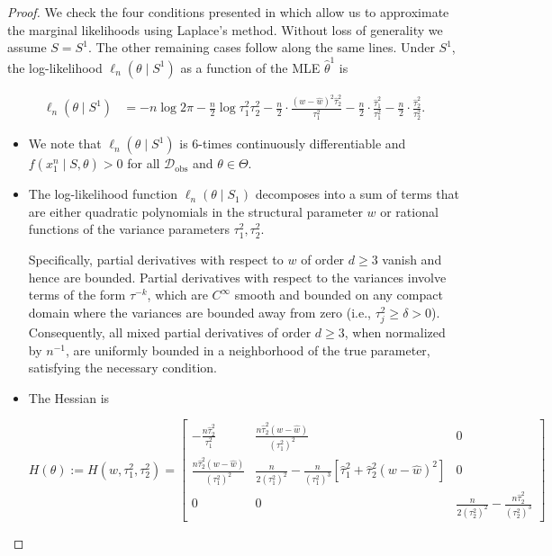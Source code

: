 \documentclass[accepted]{uai2026} %
\newcommand{\train}{\mathcal{D}}
\newcommand{\obsdata}{\train_{\text{obs}}}
\theoremstyle{boldremark}
\begin{document}
\begin{proof}
    We check the four conditions presented in \citet{Kass1990TheVO} which allow us to approximate the marginal likelihoods using Laplace's method. Without loss of generality we assume $S = S^1$. The other  remaining cases follow along the same lines. Under $S^1$, the log-likelihood $\ell_n(\theta \mid  S^1)$ as a function of the MLE $\hat{\theta}^1$ is

    \begin{align}
    \label{eq:MLE_expansion_S1}
    \ell_n(\theta \mid  S^1) &= -n \log 2\pi -\frac{n}{2}\log \tau_1^2\tau_2^2 - \frac{n}{2}\cdot\frac{(w-\hat{w})^2\hat{\tau}^2_2}{\tau_1^2} - \frac{n}{2}\cdot \frac{\hat{\tau}_1^2}{\tau_1^2}- \frac{n}{2}\cdot \frac{\hat{\tau}_2^2}{\tau_2^2}.
    \end{align}

    \begin{itemize}
        \item[(i)] We note that $\ell_n( \theta \mid S^1)$ is 6-times continuously differentiable and $f(x_1^n \mid S, \theta) >0$ for all $\obsdata$ and $\theta \in \Theta$. 

        \item[(ii)] The log-likelihood function $\ell_n(\theta\mid S_1)$ decomposes into a sum of terms that are either quadratic polynomials in the structural parameter $w$ or rational functions of the variance parameters $\tau_1^2, \tau_2^2$.

        Specifically, partial derivatives with respect to $w$ of order $d \ge 3$ vanish and hence are bounded. Partial derivatives with respect to the variances involve terms of the form $\tau^{-k}$, which are $C^\infty$ smooth and bounded on any compact domain where the variances are bounded away from zero (i.e., $\tau_j^2 \ge \delta > 0$). Consequently, all mixed partial derivatives of order $d \ge 3$, when normalized by $n^{-1}$, are uniformly bounded in a neighborhood of the true parameter, satisfying the necessary condition.

        \item[(iii)] The Hessian is 

            \begin{equation}
                H(\theta):= H(w, \tau_1^2, \tau_2^2) = 
                \begin{bmatrix} 
                -\frac{n \hat{\tau}_2^2}{\tau_1^2} & \frac{n \hat{\tau}_2^2 (w - \hat{w})}{(\tau_1^2)^2} & 0 \\
                \frac{n \hat{\tau}_2^2 (w - \hat{w})}{(\tau_1^2)^2} & \frac{n}{2(\tau_1^2)^2} - \frac{n}{(\tau_1^2)^3} \left[ \hat{\tau}_1^2 + \hat{\tau}_2^2(w-\hat{w})^2 \right] & 0 \\
                0 & 0 & \frac{n}{2(\tau_2^2)^2} - \frac{n \hat{\tau}_2^2}{(\tau_2^2)^3}
                \end{bmatrix}
            \end{equation}


\end{itemize}
\end{proof}
\end{document}
